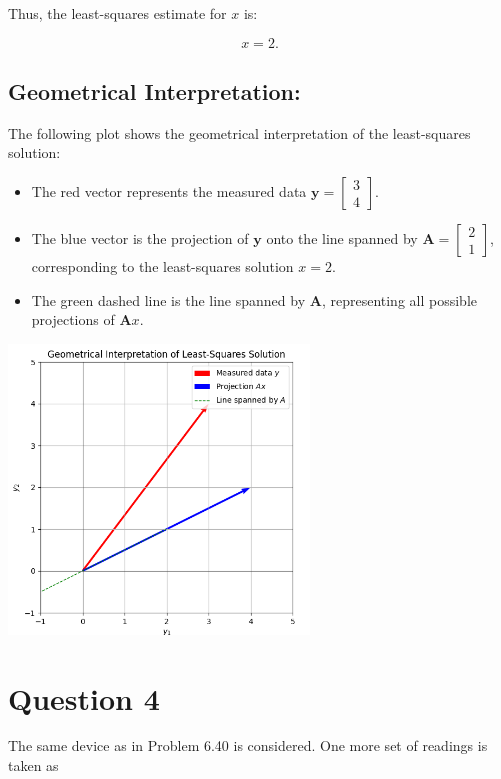 \documentclass{article}
\begin{document}
Thus, the least-squares estimate for \( x \) is:

\[
x = 2.
\]

\subsection{Geometrical Interpretation:}
The following plot shows the geometrical interpretation of the least-squares solution:

\begin{itemize}
   \item The red vector represents the measured data \( \mathbf{y} = \begin{bmatrix} 3 \\ 4 \end{bmatrix} \).
   \item The blue vector is the projection of \( \mathbf{y} \) onto the line spanned by \( \mathbf{A} = \begin{bmatrix} 2 \\ 1 \end{bmatrix} \), corresponding to the least-squares solution \( x = 2 \).
   \item The green dashed line is the line spanned by \( \mathbf{A} \), representing all possible projections of \( \mathbf{A} x \).
\end{itemize}

\begin{center}
\includegraphics[width=0.6\textwidth]{hw5q3sketch.png}
\end{center}

\section{Question 4}

The same device as in Problem 6.40 is considered. One more set of readings is taken as
\end{document}
